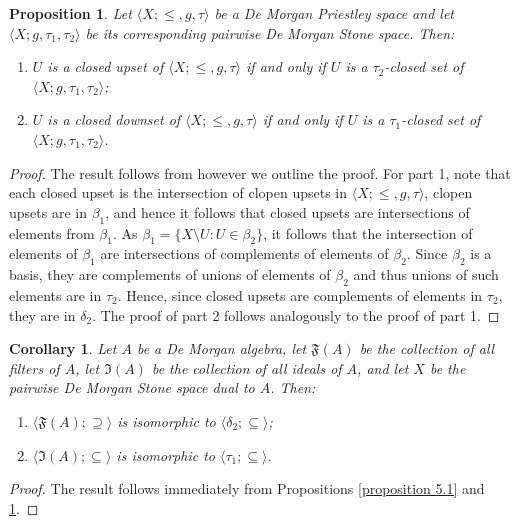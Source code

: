 \documentclass{amsart}
\theoremstyle{plain}
\newtheorem{proposition}[theorem]{Proposition}
\newtheorem{corollary}[theorem]{Corollary}
\theoremstyle{definition}
\begin{document}
\begin{proposition}\label{prop 5.5}
    Let $\langle X;\leq,g,\tau\rangle$ be a De Morgan Priestley space and let $\langle X;g,\tau_1,\tau_2\rangle$ be its corresponding pairwise De Morgan Stone space. Then: 
    \begin{enumerate}
        \item $U$ is a closed upset of $\langle X;\leq,g,\tau\rangle$ if and only if $U$ is a $\tau_2$-closed set of $\langle X;g,\tau_1,\tau_2\rangle$; 
        \item $U$ is a closed downset of $\langle X;\leq,g,\tau\rangle$ if and only if $U$ is a $\tau_1$-closed set of $\langle X;g,\tau_1,\tau_2\rangle$.  
    \end{enumerate}
\end{proposition}
\begin{proof}
 The result follows from \cite[Proposition 3.4]{bezhanishvili} however we outline the proof. For part 1, note that each closed upset is the intersection of clopen upsets in $\langle X;\leq,g,\tau\rangle$, clopen upsets are in $\beta_1$, and hence it follows that closed upsets are intersections of elements from $\beta_1$. As $\beta_1=\{X\setminus U:U\in\beta_2\}$, it follows that the intersection of elements of $\beta_1$ are intersections of complements of elements of $\beta_2$. Since $\beta_2$ is a basis, they are complements of unions of elements of $\beta_2$ and thus unions of such elements are in $\tau_2$. Hence, since closed upsets are complements of elements in $\tau_2$, they are in $\delta_2$. The proof of part 2 follows analogously to the proof of part 1.      
\end{proof}  


\begin{corollary}
      Let $A$ be a De Morgan algebra, let $\mathfrak{F}(A)$ be the collection of all filters of $A$, let $\mathfrak{I}(A)$ be the collection of all ideals of $A$, and let $X$ be the pairwise De Morgan Stone space dual to $A$. Then:
    \begin{enumerate}
        \item $\langle\mathfrak{F}(A);\supseteq\rangle$ is isomorphic to $\langle\delta_2;\subseteq\rangle$;   
        \item $\langle\mathfrak{I}(A);\subseteq\rangle$ is isomorphic to $\langle\tau_1;\subseteq\rangle$. 
    \end{enumerate}
\end{corollary}
\begin{proof}  
The result follows immediately from Propositions \ref{proposition 5.1} and \ref{prop 5.5}. 
\end{proof}
\end{document}

